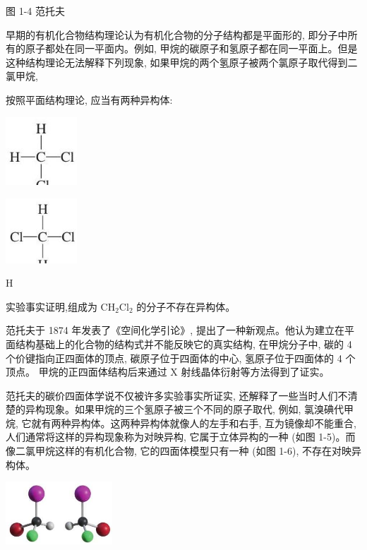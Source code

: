 \documentclass[10pt]{article}
\begin{document}
图 1-4 范托夫

早期的有机化合物结构理论认为有机化合物的分子结构都是平面形的, 即分子中所有的原子都处在同一平面内。例如, 甲烷的碳原子和氢原子都在同一平面上。但是这种结构理论无法解释下列现象, 如果甲烷的两个氢原子被两个氯原子取代得到二氯甲烷,

按照平面结构理论, 应当有两种异构体:

\begin{center}
\includegraphics[max width=0.2\textwidth]{images/0190efc5-b58a-7c43-bfb0-e0a030df9cfd_15_838016.jpg}
\end{center}

\begin{center}
\includegraphics[max width=0.2\textwidth]{images/0190efc5-b58a-7c43-bfb0-e0a030df9cfd_15_567034.jpg}
\end{center}

\(\mathrm{H}\)

实验事实证明,组成为 \({\mathrm{{CH}}}_{2}{\mathrm{{Cl}}}_{2}\) 的分子不存在异构体。

范托夫于 1874 年发表了《空间化学引论》, 提出了一种新观点。他认为建立在平面结构基础上的化合物的结构式并不能反映它的真实结构, 在甲烷分子中, 碳的 4 个价键指向正四面体的顶点, 碳原子位于四面体的中心, 氢原子位于四面体的 4 个顶点。 甲烷的正四面体结构后来通过 \(\mathrm{X}\) 射线晶体衍射等方法得到了证实。

范托夫的碳价四面体学说不仅被许多实验事实所证实, 还解释了一些当时人们不清楚的异构现象。如果甲烷的三个氢原子被三个不同的原子取代, 例如, 氯溴碘代甲烷, 它就有两种异构体。这两种异构体就像人的左手和右手, 互为镜像却不能重合, 人们通常将这样的异构现象称为对映异构, 它属于立体异构的一种 (如图 1-5)。而像二氯甲烷这样的有机化合物, 它的四面体模型只有一种 (如图 1-6), 不存在对映异构体。

\begin{center}
\includegraphics[max width=0.3\textwidth]{images/0190efc5-b58a-7c43-bfb0-e0a030df9cfd_16_961247.jpg}
\end{center}
\end{document}

